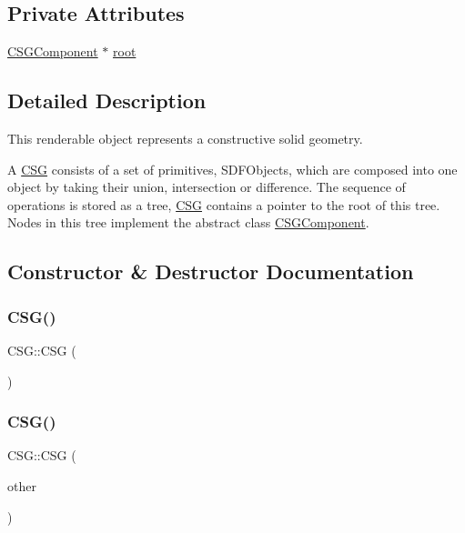 \subsection*{Private Attributes}
\begin{DoxyCompactItemize}
\item 
\mbox{\hyperlink{classCSGComponent}{C\+S\+G\+Component}} $\ast$ \mbox{\hyperlink{classCSG_ae40dbc8aa97bef8f149c1b9d69e069c5}{root}}
\end{DoxyCompactItemize}


\subsection{Detailed Description}
This renderable object represents a constructive solid geometry. 

A \mbox{\hyperlink{classCSG}{C\+SG}} consists of a set of primitives, S\+D\+F\+Objects, which are composed into one object by taking their union, intersection or difference. The sequence of operations is stored as a tree, \mbox{\hyperlink{classCSG}{C\+SG}} contains a pointer to the root of this tree. Nodes in this tree implement the abstract class \mbox{\hyperlink{classCSGComponent}{C\+S\+G\+Component}}. 

\subsection{Constructor \& Destructor Documentation}
\mbox{\label{classCSG_a09bbc9336539ecf40021a9b3ec224afd}} 
\subsubsection{\texorpdfstring{CSG()}{CSG()}\hspace{0.1cm}{\footnotesize\ttfamily [1/3]}}
{\footnotesize\ttfamily C\+S\+G\+::\+C\+SG (\begin{DoxyParamCaption}{ }\end{DoxyParamCaption})}

\mbox{\label{classCSG_a9214110752f4bfead01357b5f1f7522e}} 
\subsubsection{\texorpdfstring{CSG()}{CSG()}\hspace{0.1cm}{\footnotesize\ttfamily [2/3]}}
{\footnotesize\ttfamily C\+S\+G\+::\+C\+SG (\begin{DoxyParamCaption}\item[{const \mbox{\hyperlink{classCSG}{C\+SG}} \&}]{other }\end{DoxyParamCaption})}

